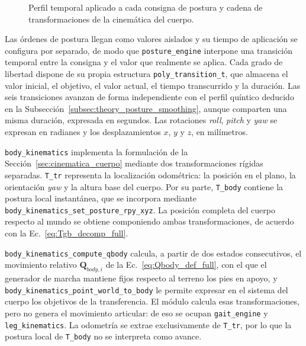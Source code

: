 \begin{figure}[H]
{}
    \captionsetup{justification=centering,singlelinecheck=false}
    \caption[Suavizado de postura y cinemática del cuerpo]
    {Perfil temporal aplicado a cada consigna de postura y cadena de
    transformaciones de la cinemática del cuerpo.}
    \label{fig:posture_body_pipeline}
\end{figure}
\vspace{-1\baselineskip}

Las órdenes de postura llegan como valores aislados y su tiempo de aplicación se
configura por separado, de modo que \texttt{posture\_engine} interpone una
transición temporal entre la consigna y el valor que realmente se aplica. Cada
grado de libertad dispone de su propia estructura
\texttt{poly\_transition\_t}, que almacena el valor inicial, el
objetivo, el valor actual, el tiempo transcurrido y la duración. Las seis
transiciones avanzan de forma independiente con el perfil quíntico deducido en
la Subsección~\ref{subsec:theory_posture_smoothing}, aunque comparten una misma
duración, expresada en segundos. Las rotaciones \textit{roll}, \textit{pitch} y
\textit{yaw} se expresan en radianes y los desplazamientos $x$, $y$ y $z$, en
milímetros.

\texttt{body\_kinematics} implementa la formulación de la
Sección~\ref{sec:cinematica_cuerpo} mediante dos transformaciones rígidas
separadas. \texttt{T\_tr} representa la localización odométrica: la
posición en el plano, la orientación \textit{yaw} y la altura base del cuerpo.
Por su parte, \texttt{T\_body} contiene la postura local instantánea, que se
incorpora mediante \texttt{body\_kinematics\_set\_posture\_rpy\_xyz}. La posición
completa del cuerpo respecto al mundo se obtiene componiendo ambas
transformaciones, de acuerdo con la Ec.~\ref{eq:Tgb_decomp_full}.

\texttt{body\_kinematics\_compute\_qbody} calcula, a partir de dos estados
consecutivos, el movimiento relativo $\mathbf{Q}_{body,i}$ de la
Ec.~\ref{eq:Qbody_def_full}, con el que el generador de marcha mantiene
fijos respecto al terreno los pies en apoyo, y
\texttt{body\_kinematics\_point\_world\_to\_body} le permite expresar en el
sistema del cuerpo los objetivos de la transferencia. El módulo calcula esas
transformaciones, pero no genera el movimiento articular: de eso se ocupan
\texttt{gait\_engine} y \texttt{leg\_kinematics}. La odometría se extrae
exclusivamente de \texttt{T\_tr}, por lo que la postura local de
\texttt{T\_body} no se interpreta como avance.

